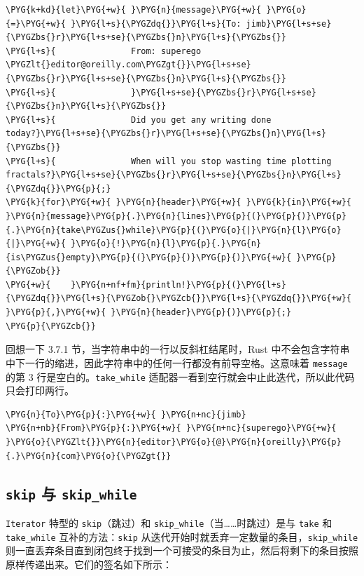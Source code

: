 \begin{Verbatim}[commandchars=\\\{\},breaklines=true,breakanywhere=true,fontsize=\codefont,xleftmargin=17bp]
\PYG{k+kd}{let}\PYG{+w}{ }\PYG{n}{message}\PYG{+w}{ }\PYG{o}{=}\PYG{+w}{ }\PYG{l+s}{\PYGZdq{}}\PYG{l+s}{To: jimb}\PYG{l+s+se}{\PYGZbs{}r}\PYG{l+s+se}{\PYGZbs{}n}\PYG{l+s}{\PYGZbs{}}
\PYG{l+s}{               From: superego \PYGZlt{}editor@oreilly.com\PYGZgt{}}\PYG{l+s+se}{\PYGZbs{}r}\PYG{l+s+se}{\PYGZbs{}n}\PYG{l+s}{\PYGZbs{}}
\PYG{l+s}{               }\PYG{l+s+se}{\PYGZbs{}r}\PYG{l+s+se}{\PYGZbs{}n}\PYG{l+s}{\PYGZbs{}}
\PYG{l+s}{               Did you get any writing done today?}\PYG{l+s+se}{\PYGZbs{}r}\PYG{l+s+se}{\PYGZbs{}n}\PYG{l+s}{\PYGZbs{}}
\PYG{l+s}{               When will you stop wasting time plotting fractals?}\PYG{l+s+se}{\PYGZbs{}r}\PYG{l+s+se}{\PYGZbs{}n}\PYG{l+s}{\PYGZdq{}}\PYG{p}{;}
\PYG{k}{for}\PYG{+w}{ }\PYG{n}{header}\PYG{+w}{ }\PYG{k}{in}\PYG{+w}{ }\PYG{n}{message}\PYG{p}{.}\PYG{n}{lines}\PYG{p}{(}\PYG{p}{)}\PYG{p}{.}\PYG{n}{take\PYGZus{}while}\PYG{p}{(}\PYG{o}{|}\PYG{n}{l}\PYG{o}{|}\PYG{+w}{ }\PYG{o}{!}\PYG{n}{l}\PYG{p}{.}\PYG{n}{is\PYGZus{}empty}\PYG{p}{(}\PYG{p}{)}\PYG{p}{)}\PYG{+w}{ }\PYG{p}{\PYGZob{}}
\PYG{+w}{    }\PYG{n+nf+fm}{println!}\PYG{p}{(}\PYG{l+s}{\PYGZdq{}}\PYG{l+s}{\PYGZob{}\PYGZcb{}}\PYG{l+s}{\PYGZdq{}}\PYG{+w}{ }\PYG{p}{,}\PYG{+w}{ }\PYG{n}{header}\PYG{p}{)}\PYG{p}{;}
\PYG{p}{\PYGZcb{}}
\end{Verbatim}

回想一下 3.7.1 节，当字符串中的一行以反斜杠结尾时，Rust 中不会包含字符串中下一行的缩进，因此字符串中的任何一行都没有前导空格。这意味着 \texttt{message} 的第 3 行是空白的。\texttt{take\_while} 适配器一看到空行就会中止此迭代，所以此代码只会打印两行。

\begin{Verbatim}[commandchars=\\\{\},breaklines=true,breakanywhere=true,fontsize=\codefont,xleftmargin=17bp]
\PYG{n}{To}\PYG{p}{:}\PYG{+w}{ }\PYG{n+nc}{jimb}
\PYG{n+nb}{From}\PYG{p}{:}\PYG{+w}{ }\PYG{n+nc}{superego}\PYG{+w}{ }\PYG{o}{\PYGZlt{}}\PYG{n}{editor}\PYG{o}{@}\PYG{n}{oreilly}\PYG{p}{.}\PYG{n}{com}\PYG{o}{\PYGZgt{}}
\end{Verbatim}

\subsection{\texttt{skip} 与 \texttt{skip\_while}}

\texttt{Iterator} 特型的 \texttt{skip}（跳过）和 \texttt{skip\_while}（当……时跳过）是与 \texttt{take} 和 \texttt{take\_while} 互补的方法：\texttt{skip} 从迭代开始时就丢弃一定数量的条目，\texttt{skip\_while} 则一直丢弃条目直到闭包终于找到一个可接受的条目为止，然后将剩下的条目按照原样传递出来。它们的签名如下所示：

